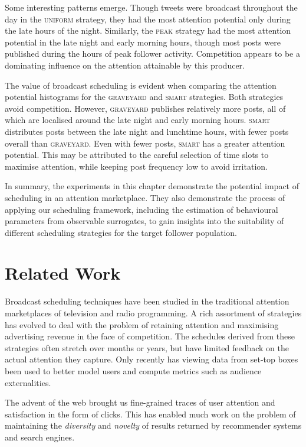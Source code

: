 \documentclass[onesided,letterpaper]{tufte-book}
\begin{document}
Some interesting patterns emerge. Though tweets were broadcast throughout the day in the \textsc{uniform} strategy, they had the most attention potential only during the late hours of the night. Similarly, the \textsc{peak} strategy had the most attention potential in the late night and early morning hours, though most posts were published during the hours of peak follower activity. Competition appears to be a dominating influence on the attention attainable by this producer.

The value of broadcast scheduling is evident when comparing the attention potential histograms for the \textsc{graveyard} and \textsc{smart} strategies. Both strategies avoid competition. However, \textsc{graveyard} publishes relatively more posts, all of which are localised around the late night and early morning hours. \textsc{smart} distributes posts between the late night and lunchtime hours, with fewer posts overall than \textsc{graveyard}. Even with fewer posts, \textsc{smart} has a greater attention potential. This may be attributed to the careful selection of time slots to maximise attention, while keeping post frequency low to avoid irritation.

In summary, the experiments in this chapter demonstrate the potential impact of scheduling in an attention marketplace. They also demonstrate the process of applying our scheduling framework, including the estimation of behavioural parameters from observable surrogates, to gain insights into the suitability of different scheduling strategies for the target follower population.

\chapter{Related Work}
\label{ch:related-work}

Broadcast scheduling techniques have been studied in the traditional attention marketplaces of television and radio programming\cite{eastman2012media}\cite{vane1994programming}. A rich assortment of strategies has evolved to deal with the problem of retaining attention and maximising advertising revenue in the face of competition. The schedules derived from these strategies often stretch over months or years, but have limited feedback on the actual attention they capture. Only recently has viewing data from set-top boxes been used to better model users and compute metrics such as audience externalities\cite{wilbur2013audience}.

The advent of the web brought us fine-grained traces of user attention and satisfaction in the form of clicks. This has enabled much work on the problem of maintaining the \textit{diversity} and \textit{novelty} of results returned by recommender systems\cite{Ziegler:2005:IRL:1060745.1060754} and search engines\cite{Agrawal:2009:DSR:1498759.1498766}.
\end{document}
